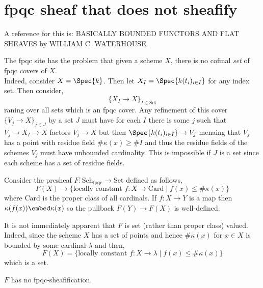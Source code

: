 \documentclass[12pt]{article}
\begin{document}
\section{fpqc sheaf that does not sheafify}

\newcommand{\Set}{\mathrm{Set}}

\begin{rmk}
A reference for this is: BASICALLY BOUNDED FUNCTORS AND FLAT SHEAVES by WILLIAM C. WATERHOUSE.
\end{rmk}

The fpqc site has the problem that given a scheme $X$, there is no cofinal \textit{set} of fpqc covers of $X$.
\bigskip\\
Indeed, consider $X = \Spec{k}$. Then let $X_I = \Spec{k(t_i)_{i \in I}}$ for any index set. Then consider,
\[ \{ X_I \to X \}_{I \in \Set} \]
raning over all sets which is an fpqc cover. Any refinement of this cover $\{ V_j \to X \}_{j \in J}$ by a set $J$ must have for each $I$ there is some $j$ such that $V_j \to X_I \to X$ factors $V_j \to X$ but then $\Spec{k(t_i)_{i \in I}} \to V_j$ menaing that $V_j$ has a point with residue field $\# \kappa(x) \ge \# I$ and thus the residue fields of the schemes $V_j$ must have unbounded cardinality. This is impossible if $J$ is a set since each scheme has a set of residue fields.

\begin{defn}
Consider the presheaf $F : \mathrm{Sch}_{\text{fpqc}} \to \Set$ defined as follows,
\[ F(X) \to \{ \text{locally constant } f : X \to \mathrm{Card} \mid f(x) \le \# \kappa(x) \} \]
where $\mathrm{Card}$ is the proper class of all cardinals. If $f : X \to Y$ is a map then $\kappa(f(x)) \embed \kappa(x)$ so the pullback $F(Y) \to F(X)$ is well-defined.
\end{defn}

\begin{rmk}
It is not immediately apparent that $F$ is set (rather than proper class) valued. Indeed, since the scheme $X$ has a set of points and hence $\# \kappa(x)$ for $x \in X$ is bounded by some cardinal $\lambda$ and then,
\[ F(X) = \{ \text{locally constant } f : X \to \lambda \mid f(x) \le \# \kappa(x) \} \]
which is a set.
\end{rmk}

\begin{prop}
$F$ has no fpqc-sheafification.
\end{prop}
\end{document}
